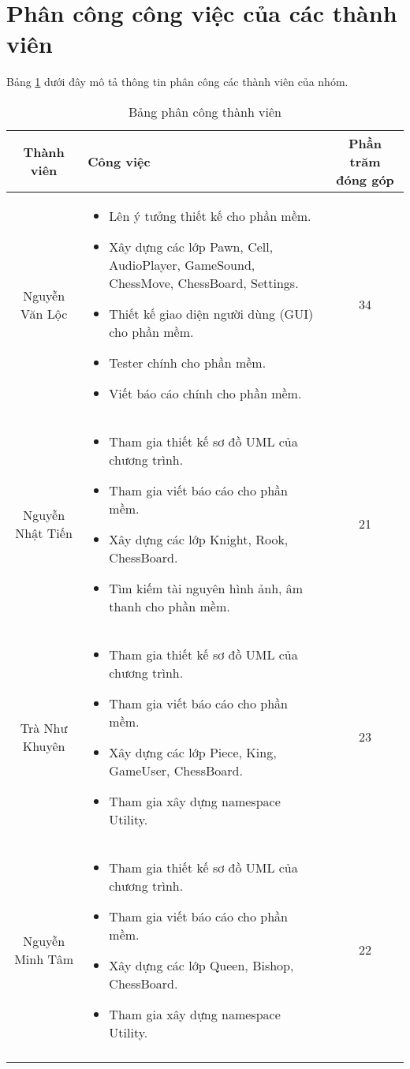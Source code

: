 \section{Phân công công việc của các thành viên}
Bảng \ref{jobs} dưới đây mô tả thông tin phân công các thành viên của nhóm.
\begin{longtable}{|c| p{}|c|} 
\hline 
Thành viên & Công việc & Phần trăm đóng góp \\ 
\hline 
Nguyễn Văn Lộc & \begin{itemize}
\item Lên ý tưởng thiết kế cho phần mềm.
\item Xây dựng các lớp Pawn, Cell, AudioPlayer, GameSound, ChessMove, ChessBoard, Settings.
\item Thiết kế giao diện người dùng (GUI) cho phần mềm.
\item Tester chính cho phần mềm.
\item Viết báo cáo chính cho phần mềm.
\end{itemize} & 34 \\ 
\hline 
Nguyễn Nhật Tiến & \begin{itemize}
\item Tham gia thiết kế sơ đồ UML của chương trình.
\item Tham gia viết báo cáo cho phần mềm.
\item Xây dựng các lớp Knight, Rook, ChessBoard.
\item Tìm kiếm tài nguyên hình ảnh, âm thanh cho phần mềm.
\end{itemize} & 21 \\ 
\hline 
Trà Như Khuyên & \begin{itemize}
\item Tham gia thiết kế sơ đồ UML của chương trình.
\item Tham gia viết báo cáo cho phần mềm.
\item Xây dựng các lớp Piece, King, GameUser, ChessBoard. \item Tham gia xây dựng namespace Utility.
\end{itemize} & 23 \\ 
\hline 
Nguyễn Minh Tâm & \begin{itemize}
\item Tham gia thiết kế sơ đồ UML của chương trình.
\item Tham gia viết báo cáo cho phần mềm.
\item Xây dựng các lớp Queen, Bishop, ChessBoard.
\item Tham gia xây dựng namespace Utility.
\end{itemize} & 22 \\ 
\hline 
\caption{Bảng phân công thành viên}
\label{jobs}
\end{longtable} 
